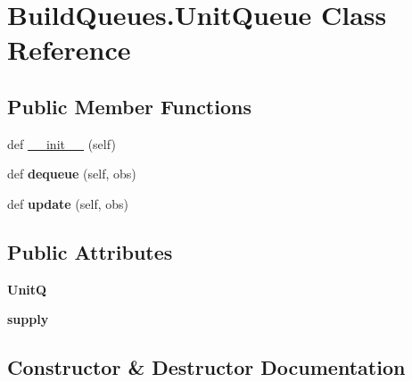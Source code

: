 \hypertarget{classBuildQueues_1_1UnitQueue}{}\section{Build\+Queues.\+Unit\+Queue Class Reference}
\label{classBuildQueues_1_1UnitQueue}
\subsection*{Public Member Functions}
\begin{DoxyCompactItemize}
\item 
def \hyperlink{classBuildQueues_1_1UnitQueue_ae5a1144fed23da3fe9ca8c1ae0c9718d}{\+\_\+\+\_\+init\+\_\+\+\_\+} (self)
\item 
def {\bfseries dequeue} (self, obs)\hypertarget{classBuildQueues_1_1UnitQueue_aaec23a79990442accceaeca29cf71aa9}{}\label{classBuildQueues_1_1UnitQueue_aaec23a79990442accceaeca29cf71aa9}

\item 
def {\bfseries update} (self, obs)\hypertarget{classBuildQueues_1_1UnitQueue_a1c049d56542cc875d447d080ffe1156a}{}\label{classBuildQueues_1_1UnitQueue_a1c049d56542cc875d447d080ffe1156a}

\end{DoxyCompactItemize}
\subsection*{Public Attributes}
\begin{DoxyCompactItemize}
\item 
{\bfseries UnitQ}\hypertarget{classBuildQueues_1_1UnitQueue_a7ab2923b0cf7a4aa672c00987fe16f6c}{}\label{classBuildQueues_1_1UnitQueue_a7ab2923b0cf7a4aa672c00987fe16f6c}

\item 
{\bfseries supply}\hypertarget{classBuildQueues_1_1UnitQueue_a6dc53257037e1337109b09d994ef25cc}{}\label{classBuildQueues_1_1UnitQueue_a6dc53257037e1337109b09d994ef25cc}

\end{DoxyCompactItemize}


\subsection{Constructor \& Destructor Documentation}
